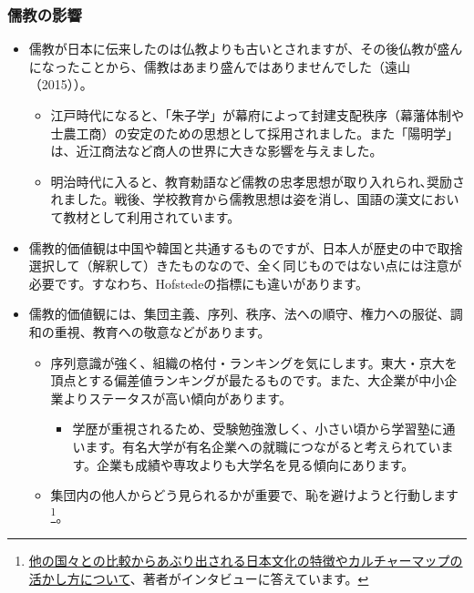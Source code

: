 \documentclass[
]{book}
\providecommand{\tightlist}{%
  \setlength{\itemsep}{0pt}\setlength{\parskip}{0pt}}
\begin{document}
\hypertarget{ux5112ux6559ux306eux5f71ux97ff}{%
\subsubsection{儒教の影響}\label{ux5112ux6559ux306eux5f71ux97ff}}

\begin{itemize}
\item
  儒教が日本に伝来したのは仏教よりも古いとされますが、その後仏教が盛んになったことから、儒教はあまり盛んではありませんでした（遠山（2015））。

  \begin{itemize}
  \item
    江戸時代になると、「朱子学」が幕府によって封建支配秩序（幕藩体制や士農工商）の安定のための思想として採用されました。また「陽明学」は、近江商法など商人の世界に大きな影響を与えました。
  \item
    明治時代に入ると、教育勅語など儒教の忠孝思想が取り入れられ､奨励されました。戦後、学校教育から儒教思想は姿を消し、国語の漢文において教材として利用されています。
  \end{itemize}
\item
  儒教的価値観は中国や韓国と共通するものですが、日本人が歴史の中で取捨選択して（解釈して）きたものなので、全く同じものではない点には注意が必要です。すなわち、Hofstedeの指標にも違いがあります。
\item
  儒教的価値観には、集団主義、序列、秩序、法への順守、権力への服従、調和の重視、教育への敬意などがあります。

  \begin{itemize}
  \item
    序列意識が強く、組織の格付・ランキングを気にします。東大・京大を頂点とする偏差値ランキングが最たるものです。また、大企業が中小企業よりステータスが高い傾向があります。

    \begin{itemize}
    \tightlist
    \item
      学歴が重視されるため、受験勉強激しく、小さい頃から学習塾に通います。有名大学が有名企業への就職につながると考えられています。企業も成績や専攻よりも大学名を見る傾向にあります。
    \end{itemize}
  \item
    集団内の他人からどう見られるかが重要で、恥を避けようと行動します\footnote{\href{https://plus.alc.co.jp/2018/01/meyer/}{他の国々との比較からあぶり出される日本文化の特徴やカルチャーマップの活かし方について}、著者がインタビューに答えています。}。


\end{itemize}
\end{itemize}
\end{document}
